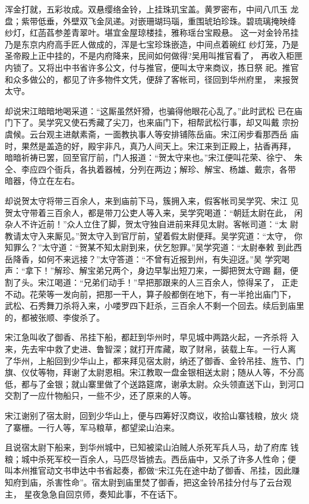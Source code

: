 浑金打就，五彩妆成。双悬缨络金铃，上挂珠玑宝盖。黄罗密布，中间八爪玉
龙盘；紫带低垂，外壁双飞金凤递。对嵌珊瑚玛瑙，重围琥珀珍珠。碧琉璃掩映绛
纱灯，红菡萏参差青翠叶。堪宜金屋琼楼挂，雅称瑶台宝殿悬。
这一对金铃吊挂乃是东京内府高手匠人做成的，浑是七宝珍珠嵌造，中间点着碗红
纱灯笼，乃是圣帝殿上正中挂的，不是内府降来，民间如何做得?吴用叫推官看了，
再收入柜匣内锁了。又将出中书省许多公文，付与推官，便叫太守来商议，拣日祭
祀。推官和众多做公的，都见了许多物件文凭，便辞了客帐司，径回到华州府里，
来报贺太守。

却说宋江暗暗地喝采道：“这厮虽然奸猾，也骗得他眼花心乱了。”此时武松
已在庙门下了。吴学究又使石秀藏了尖刀，也来庙门下，相帮武松行事，却又叫戴
宗扮虞候。云台观主进献素斋，一面教执事人等安排铺陈岳庙。宋江闲步看那西岳
庙时，果然是盖造的好，殿宇非凡，真乃人间天上。宋江来到正殿上，拈香再拜，
暗暗祈祷已罢，回至官厅前，门人报道：“贺太守来也。”宋江便叫花荣、徐宁、
朱仝、李应四个衙兵，各执着器械，分列在两边；解珍、解宝、杨雄、戴宗，各带
暗器，侍立在左右。

却说贺太守将带三百余人，来到庙前下马，簇拥入来，假客帐司吴学究、宋江
见贺太守带着三百余人，都是带刀公吏人等入来，吴学究喝道：“朝廷太尉在此，
闲杂人不许近前！”众人立住了脚，贺太守独自进前来拜见太尉。客帐司道：“太
尉教请太守入来厮见。”贺太守入到官厅前，望着假太尉便拜。吴学究道：“太守，
你知罪么？”太守道：“贺某不知太尉到来，伏乞恕罪。”吴学究道：“太尉奉敕
到此西岳降香，如何不来远接？”太守答道：“不曾有近报到州，有失迎迓。”吴
学究喝声：“拿下！”解珍、解宝弟兄两个，身边早掣出短刀来，一脚把贺太守踢
翻，便割了头。宋江喝道：“兄弟们动手！”早把那跟来的人三百余人，惊得呆了，
正走不动。花荣等一发向前，把那一干人，算子般都倒在地下，有一半抢出庙门下，
武松、石秀舞刀杀将入来，小喽罗四下赶杀，三百余人不剩一个回去。续后到庙里
的，都被张顺、李俊杀了。

宋江急叫收了御香、吊挂下船，都赶到华州时，早见城中两路火起，一齐杀将
入来，先去牢中救了史进、鲁智深；就打开库藏，取了财帛，装载上车。一行人离
了华州，上船回到少华山上，都来拜见宿太尉，纳还了御香、金铃吊挂、旌节、门
旗、仪仗等物，拜谢了太尉恩相。宋江教取一盘金银相送太尉；随从人等，不分高
低，都与了金银；就山寨里做了个送路筵席，谢承太尉。众头领直送下山，到河口
交割了一应什物船只，一些不少，还了原来的人等。

宋江谢别了宿太尉，回到少华山上，便与四筹好汉商议，收拾山寨钱粮，放火
烧了寨栅。一行人等，军马粮草，都望梁山泊来。

且说宿太尉下船来，到华州城中，已知被梁山泊贼人杀死军兵人马，劫了府库
钱粮；城中杀死军校一百余人，马匹尽皆掳去。西岳庙中，又杀了许多人性命；便
叫本州推官动文书申达中书省起奏，都做“宋江先在途中劫了御香、吊挂，因此赚
知府到庙，杀害性命”。宿太尉到庙里焚了御香，把这金铃吊挂分付与了云台观主，
星夜急急自回京师，奏知此事，不在话下。

